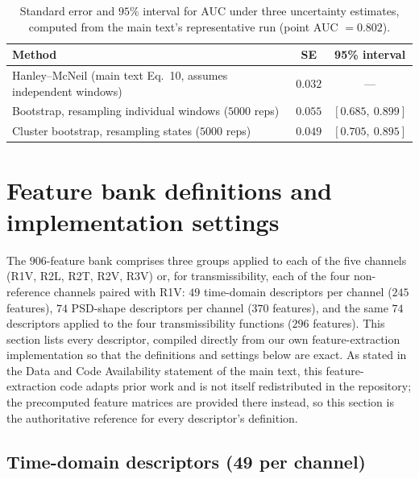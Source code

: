 \documentclass[11pt,a4paper]{article}
\begin{document}
\begin{table}[htbp]
\centering
\caption{Standard error and $95\%$ interval for AUC under three uncertainty
estimates, computed from the main text's representative run (point
AUC $=0.802$).}
\label{tab:bootstrap}
\small
\begin{tabular}{@{}lcc@{}}
\toprule
\textbf{Method} & \textbf{SE} & \textbf{95\% interval} \\
\midrule
Hanley--McNeil (main text Eq.~10, assumes independent windows) & $0.032$ & --- \\
Bootstrap, resampling individual windows ($5000$ reps)         & $0.055$ & $[0.685,\ 0.899]$ \\
Cluster bootstrap, resampling states ($5000$ reps)              & $0.049$ & $[0.705,\ 0.895]$ \\
\bottomrule
\end{tabular}
\end{table}

\section{Feature bank definitions and implementation settings}
\label{sec:featuredefs}

The $906$-feature bank comprises three groups applied to each of the five
channels (R1V, R2L, R2T, R2V, R3V) or, for transmissibility, each of the
four non-reference channels paired with R1V: $49$ time-domain descriptors
per channel ($245$ features), $74$ PSD-shape descriptors per channel
($370$ features), and the same $74$ descriptors applied to the four
transmissibility functions ($296$ features). This section lists every
descriptor, compiled directly from our own feature-extraction implementation
so that the definitions and settings below are exact. As stated in the Data
and Code Availability statement of the main text, this feature-extraction
code adapts prior work and is not itself redistributed in the repository;
the precomputed feature matrices are provided there instead, so this section
is the authoritative reference for every descriptor's definition.

\subsection{Time-domain descriptors (49 per channel)}
\end{document}
